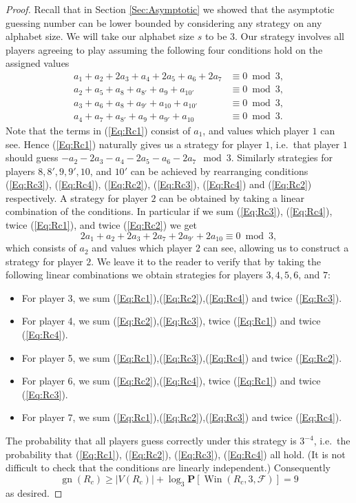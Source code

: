 \documentclass[a4paper, 14pt]{extarticle}
\theoremstyle{plain}
\def\mc{\mathcal}
\def\mb{\mathbf}
\DeclareMathOperator{\gn}{gn}
\DeclareMathOperator{\Win}{Win}
\begin{document}
\begin{proof}
Recall that in Section \ref{Sec:Asymptotic} we showed that the asymptotic guessing
number can be lower bounded by considering any strategy on any
alphabet size. We will take our alphabet size $s$ to be $3$. Our
strategy involves all players agreeing to play assuming the
following four conditions hold on the assigned values
\begin{align}
a_1+a_2+2a_3+a_4+2a_5+a_6+2a_7 &\equiv 0 \bmod 3,\label{Eq:Rc1}\\
a_2+a_5+a_8+a_{8'}+a_9+a_{10'} &\equiv 0 \bmod 3,\label{Eq:Rc2}\\
a_3+a_6+a_8+a_{9'}+a_{10}+a_{10'} &\equiv 0 \bmod 3,\label{Eq:Rc3}\\
a_4+a_7+a_{8'}+a_9+a_{9'}+a_{10} &\equiv 0 \bmod 3.\label{Eq:Rc4}
\end{align}
Note that the terms in (\ref{Eq:Rc1}) consist of $a_1$, and values
which player $1$ can see. Hence (\ref{Eq:Rc1}) naturally gives us a
strategy for player $1$, i.e.\ that player $1$ should guess
$-a_2-2a_3-a_4-2a_5-a_6-2a_7\mod 3$. Similarly strategies for
players $8,8',9,9',10$, and $10'$ can be achieved by rearranging
conditions (\ref{Eq:Rc3}), (\ref{Eq:Rc4}), (\ref{Eq:Rc2}),
(\ref{Eq:Rc3}), (\ref{Eq:Rc4}) and (\ref{Eq:Rc2}) respectively. A
strategy for player $2$ can be obtained by taking a linear
combination of the conditions. In particular if we sum
(\ref{Eq:Rc3}), (\ref{Eq:Rc4}), twice (\ref{Eq:Rc1}), and twice
(\ref{Eq:Rc2}) we get
\[
2a_1+a_2+2a_3+2a_7+2a_{9'}+2a_{10} \equiv 0 \bmod 3,
\]
which consists of $a_2$ and values which player $2$ can see,
allowing us to construct a strategy for player $2$. We leave it to the reader to verify that by taking the following linear combinations we obtain strategies for players $3,4,5,6$, and $7$:
\begin{itemize}
\item For player 3, we sum (\ref{Eq:Rc1}),(\ref{Eq:Rc2}),(\ref{Eq:Rc4}) and twice (\ref{Eq:Rc3}).
\item For player 4, we sum (\ref{Eq:Rc2}),(\ref{Eq:Rc3}), twice (\ref{Eq:Rc1}) and twice (\ref{Eq:Rc4}).
\item For player 5, we sum (\ref{Eq:Rc1}),(\ref{Eq:Rc3}),(\ref{Eq:Rc4}) and twice (\ref{Eq:Rc2}).
\item For player 6, we sum (\ref{Eq:Rc2}),(\ref{Eq:Rc4}), twice (\ref{Eq:Rc1}) and twice (\ref{Eq:Rc3}).
\item For player 7, we sum (\ref{Eq:Rc1}),(\ref{Eq:Rc2}),(\ref{Eq:Rc3}) and twice (\ref{Eq:Rc4}).
\end{itemize}

The probability that all players guess correctly under this strategy
is $3^{-4}$, i.e.\ the probability that (\ref{Eq:Rc1}),
(\ref{Eq:Rc2}), (\ref{Eq:Rc3}), (\ref{Eq:Rc4}) all hold. (It is not difficult to check that the conditions are linearly independent.)
Consequently
\[\gn(R_c) \geq |V(R_c)|+\log_3 \mb{P}[\Win(R_c,3,\mc{F})] = 9\]
as desired.
\end{proof}
\end{document}

